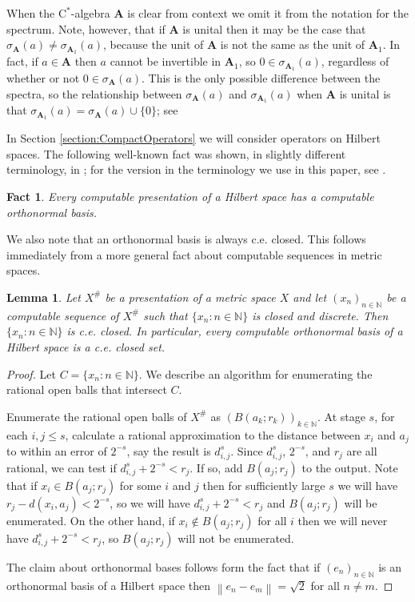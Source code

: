 \documentclass{amsart}
\newcommand{\norm}[1]{\left\| #1 \right\|}
\newcommand{\boldA}{\mathbf{A}}
\newcommand{\cstar}{$\mathrm{C}^*$}
\theoremstyle{plain}
\newtheorem{lemma}[theorem]{Lemma}
\newtheorem{fact}[theorem]{Fact}
\theoremstyle{definition}
\numberwithin{equation}{section}
\begin{document}
When the \cstar-algebra $\boldA$ is clear from context we omit it from the notation for the spectrum.  Note, however, that if $\boldA$ is unital then it may be the case that $\sigma_{\boldA}(a) \neq \sigma_{\boldA_1}(a)$, because the unit of $\boldA$ is not the same as the unit of $\boldA_1$.  In fact, if $a \in \boldA$ then $a$ cannot be invertible in $\boldA_1$, so $0 \in \sigma_{\boldA_1}(a)$, regardless of whether or not $0 \in \sigma_\boldA(a)$.  This is the only possible difference between the spectra, so the relationship between $\sigma_{\boldA}(a)$ and $\sigma_{\boldA_1}(a)$ when $\boldA$ is unital is that $\sigma_{\boldA_1}(a) = \sigma_{\boldA}(a) \cup \{0\}$; see \cite[paragraph after Remark 2.2.1]{Murphy.1990}

In Section \ref{section:CompactOperators} we will consider operators on Hilbert spaces.  The following well-known fact was shown, in slightly different terminology, in \cite[Lemma 7]{PourElRichards.1989}; for the version in the terminology we use in this paper, see \cite[Lemma 3.1]{BrattkaYoshikawa}.

\begin{fact}\label{fact:ONB}
Every computable presentation of a Hilbert space has a computable orthonormal basis.
\end{fact}

We also note that an orthonormal basis is always c.e. closed.  This follows immediately from a more general fact about computable sequences in metric spaces.

\begin{lemma}\label{lem:ONB.ce.closed}
Let $X^\#$ be a presentation of a metric space $X$ and let $(x_n)_{n \in \mathbb{N}}$ be a computable sequence of $X^\#$ such that $\{x_n : n \in \mathbb{N}\}$ is closed and discrete.  Then $\{x_n : n \in \mathbb{N}\}$ is c.e. closed.  In particular, every computable orthonormal basis of a Hilbert space is a c.e. closed set.
\end{lemma}

\begin{proof}
Let $C = \{x_n : n \in \mathbb{N}\}$.  We describe an algorithm for enumerating the rational open balls that intersect $C$.

Enumerate the rational open balls of $X^\#$ as $(B(a_k; r_k))_{k \in \mathbb{N}}$.  At stage $s$, for each $i, j \leq s$, calculate a rational approximation to the distance between $x_i$ and $a_j$ to within an error of $2^{-s}$, say the result is $d^s_{i,j}$.  Since $d^s_{i, j}$, $2^{-s}$, and $r_j$ are all rational, we can test if $d^s_{i,j}+2^{-s} < r_j$.  If so, add $B(a_j; r_j)$ to the output.  Note that if $x_i \in B(a_j; r_j)$ for some $i$ and $j$ then for sufficiently large $s$ we will have $r_j - d(x_i, a_j) < 2^{-s}$, so we will have $d^s_{i,j}+2^{-s} < r_j$ and $B(a_j; r_j)$ will be enumerated.  On the other hand, if $x_i \not\in B(a_j; r_j)$ for all $i$ then we will never have $d^s_{i,j}+2^{-s} < r_j$, so $B(a_j; r_j)$ will not be enumerated.

The claim about orthonormal bases follows form the fact that if $(e_n)_{n \in \mathbb{N}}$ is an orthonormal basis of a Hilbert space then $\norm{e_n - e_m} = \sqrt{2}$ for all $n \neq m$.
\end{proof}
\end{document}
